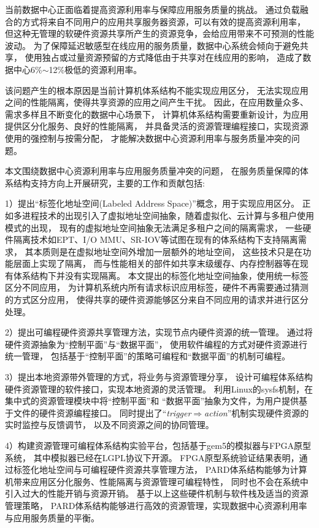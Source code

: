 \begin{cabstract}
  当前数据中心正面临着提高资源利用率与保障应用服务质量的挑战。
  通过负载融合的方式将来自不同用户的应用共享服务器资源，可以有效的提高资源利用率，
  但这种无管理的软硬件资源共享所产生的资源竞争，会给应用带来不可预测的性能波动。
  为了保障延迟敏感型在线应用的服务质量，数据中心系统会倾向于避免共享，
  使用独占或过量资源预留的方式降低由于共享对在线应用的影响，
  造成了数据中心6\%$\sim$12\%极低的资源利用率。

  该问题产生的根本原因是当前计算机体系结构不能实现应用区分，
  无法实现应用之间的性能隔离，使得共享资源的应用之间产生干扰。
  因此，在应用数量众多、需求多样且不断变化的数据中心场景下，
  计算机体系结构需要重新设计，为应用提供区分化服务、良好的性能隔离，
  并具备灵活的资源管理编程接口，实现资源使用的强控制与按需分配，
  才能解决数据中心资源利用率与服务质量冲突的问题。

  本文围绕数据中心资源利用率与应用服务质量冲突的问题，
  在服务质量保障的体系结构支持方向上开展研究，主要的工作和贡献包括:

  1）提出``标签化地址空间(Labeled Address Space)''概念，用于实现应用区分。
     正如多进程技术的出现引入了虚拟地址空间抽象，随着虚拟化、云计算与多租户使用模式的出现，
     现有的虚拟地址空间抽象无法满足多租户之间的隔离需求，
     一些硬件隔离技术如EPT、I/O MMU、SR-IOV等试图在现有的体系结构下支持隔离需求，
     其本质则是在虚拟地址空间外增加一层额外的地址空间，
     这些技术只是在功能层面上实现了隔离，
     而与性能相关的部件如共享末级缓存、内存控制器等在现有体系结构下并没有实现隔离。
     本文提出的标签化地址空间抽象，使用统一标签区分不同应用，
     为计算机系统内所有请求标识应用标签，硬件不再需要通过猜测的方式区分应用，
     使得共享的硬件资源能够区分来自不同应用的请求并进行区分处理。

  2）提出可编程硬件资源共享管理方法，实现节点内硬件资源的统一管理。
     通过将硬件资源抽象为``控制平面''与``数据平面''，
     使用软件编程的方式对硬件资源进行统一管理，
     包括基于``控制平面''的策略可编程和``数据平面''的机制可编程。

  3）提出本地资源带外管理的方式，将业务与资源管理分享，
     设计可编程体系结构硬件资源管理的软件接口，实现本地资源的灵活管理。
     利用Linux的sysfs机制，在集中式的资源管理模块中将``控制平面''和
     ``数据平面''抽象为文件，为用户提供基于文件的硬件资源编程接口。
     同时提出了``\emph{trigger$\Rightarrow$action}''机制实现硬件资源的实时监控与反馈调节，
     以及不同资源之间的协同管理。

  4）构建资源管理可编程体系结构实验平台，包括基于gem5的模拟器与FPGA原型系统，
     其中模拟器已经在LGPL协议下开源。
     FPGA原型系统验证结果表明，通过标签化地址空间与可编程硬件资源共享管理方法，
     PARD体系结构能够为计算机带来应用区分化服务、性能隔离与资源管理可编程特性，
     同时也不会在系统中引入过大的性能开销与资源开销。
     基于以上这些硬件机制与软件栈及适当的资源管理策略，
     PARD体系结构能够进行高效的资源管理，实现数据中心资源利用率与应用服务质量的平衡。
\end{cabstract}

